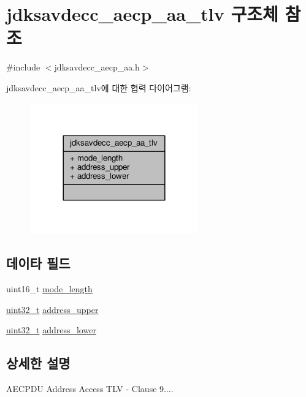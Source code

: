 \hypertarget{structjdksavdecc__aecp__aa__tlv}{}\section{jdksavdecc\+\_\+aecp\+\_\+aa\+\_\+tlv 구조체 참조}
\label{structjdksavdecc__aecp__aa__tlv}


{\ttfamily \#include $<$jdksavdecc\+\_\+aecp\+\_\+aa.\+h$>$}



jdksavdecc\+\_\+aecp\+\_\+aa\+\_\+tlv에 대한 협력 다이어그램\+:
\nopagebreak
\begin{figure}[H]
\begin{center}
\leavevmode
\includegraphics[width=204pt]{structjdksavdecc__aecp__aa__tlv__coll__graph}
\end{center}
\end{figure}
\subsection*{데이타 필드}
\begin{DoxyCompactItemize}
\item 
uint16\+\_\+t \hyperlink{structjdksavdecc__aecp__aa__tlv_aa411bf53df719d8cdbc9ee46e087ef94}{mode\+\_\+length}
\item 
\hyperlink{parse_8c_a6eb1e68cc391dd753bc8ce896dbb8315}{uint32\+\_\+t} \hyperlink{structjdksavdecc__aecp__aa__tlv_ab0df98b893a141626b459c7b2044f8a7}{address\+\_\+upper}
\item 
\hyperlink{parse_8c_a6eb1e68cc391dd753bc8ce896dbb8315}{uint32\+\_\+t} \hyperlink{structjdksavdecc__aecp__aa__tlv_ac321f0e93cb752462e777998c2342240}{address\+\_\+lower}
\end{DoxyCompactItemize}


\subsection{상세한 설명}
A\+E\+C\+P\+DU Address Access T\+LV -\/ Clause 9.... 

